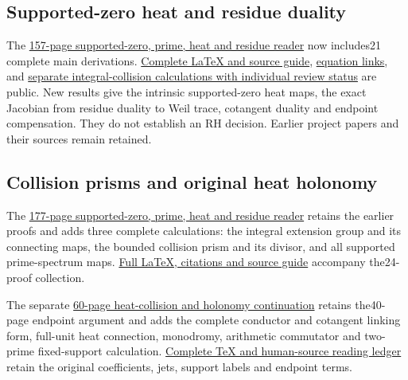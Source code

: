 \documentclass[
]{article}
\begin{document}
\subsection{Supported-zero heat and residue
duality}\label{supported-zero-heat-and-residue-duality}

The
\href{https://github.com/KokunoYumeto/zeta-function-research-reader/blob/main/workbenches/splitzero-tandem/branches/tau-zero-prime-positivity/TAU_ZERO_PRIME_POSITIVITY.pdf}{157-page
supported-zero, prime, heat and residue reader} now includes21 complete
main derivations.
\href{https://github.com/KokunoYumeto/zeta-function-research-reader/blob/main/workbenches/splitzero-tandem/branches/tau-zero-prime-positivity/PUBLICATION_COMPANION.md}{Complete
LaTeX and source guide},
\href{https://github.com/KokunoYumeto/zeta-function-research-reader/blob/main/workbenches/splitzero-tandem/branches/tau-zero-prime-positivity/PUBLICATION_INDEX.json}{equation
links}, and
\href{https://github.com/KokunoYumeto/zeta-function-research-reader/blob/main/workbenches/splitzero-tandem/branches/tau-zero-prime-positivity/research_calculations/STATUS.json}{separate
integral-collision calculations with individual review status} are
public. New results give the intrinsic supported-zero heat maps, the
exact Jacobian from residue duality to Weil trace, cotangent duality and
endpoint compensation. They do not establish an RH decision. Earlier
project papers and their sources remain retained.

\subsection{Collision prisms and original heat
holonomy}\label{collision-prisms-and-original-heat-holonomy}

The
\href{https://github.com/KokunoYumeto/zeta-function-research-reader/blob/main/workbenches/splitzero-tandem/branches/tau-zero-prime-positivity/TAU_ZERO_PRIME_POSITIVITY.pdf}{177-page
supported-zero, prime, heat and residue reader} retains the earlier
proofs and adds three complete calculations: the integral extension
group and its connecting maps, the bounded collision prism and its
divisor, and all supported prime-spectrum maps.
\href{https://github.com/KokunoYumeto/zeta-function-research-reader/blob/main/workbenches/splitzero-tandem/branches/tau-zero-prime-positivity/PUBLICATION_COMPANION.md}{Full
LaTeX, citations and source guide} accompany the24-proof collection.

The separate
\href{https://github.com/KokunoYumeto/zeta-function-research-reader/blob/main/workbenches/splitzero-tandem/continuations/20260923-supported-zero-collision-holonomy/SUPPORTED_ZERO_COLLISION_HOLONOMY.pdf}{60-page
heat-collision and holonomy continuation} retains the40-page endpoint
argument and adds the complete conductor and cotangent linking form,
full-unit heat connection, monodromy, arithmetic commutator and
two-prime fixed-support calculation.
\href{https://github.com/KokunoYumeto/zeta-function-research-reader/blob/main/workbenches/splitzero-tandem/continuations/20260923-supported-zero-collision-holonomy/README.md}{Complete
TeX and human-source reading ledger} retain the original coefficients,
jets, support labels and endpoint terms.
\end{document}
